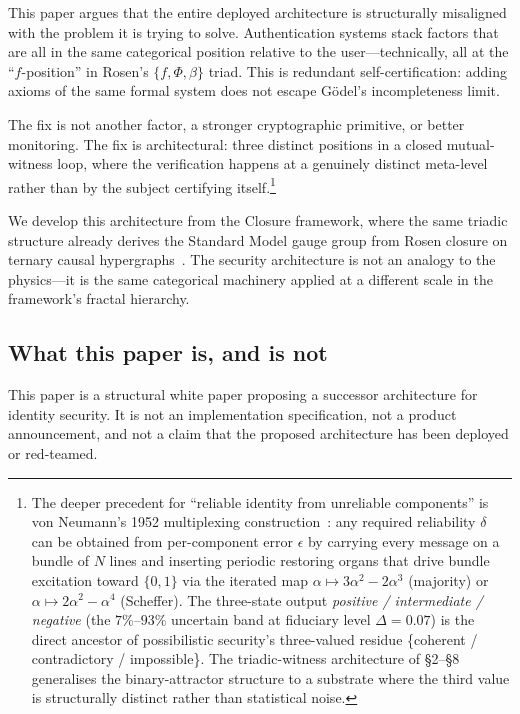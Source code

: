 \documentclass[11pt,a4paper]{article}
\theoremstyle{definition}
\theoremstyle{remark}
\begin{document}
This paper argues that the entire deployed architecture is structurally misaligned with the problem it is trying to solve. Authentication systems stack factors that are all in the same categorical position relative to the user---technically, all at the ``$f$-position'' in Rosen's $\{f, \Phi, \beta\}$ triad. This is redundant self-certification: adding axioms of the same formal system does not escape G\"odel's incompleteness limit.

The fix is not another factor, a stronger cryptographic primitive, or better monitoring. The fix is architectural: three distinct positions in a closed mutual-witness loop, where the verification happens at a genuinely distinct meta-level rather than by the subject certifying itself.\footnote{The deeper precedent for ``reliable identity from unreliable components'' is von Neumann's 1952 multiplexing construction~\cite{vonNeumann1952}: any required reliability $\delta$ can be obtained from per-component error $\epsilon$ by carrying every message on a bundle of $N$ lines and inserting periodic restoring organs that drive bundle excitation toward $\{0, 1\}$ via the iterated map $\alpha \mapsto 3\alpha^2 - 2\alpha^3$ (majority) or $\alpha \mapsto 2\alpha^2 - \alpha^4$ (Scheffer). The three-state output \emph{positive / intermediate / negative} (the $7\%$--$93\%$ uncertain band at fiduciary level $\Delta = 0.07$) is the direct ancestor of possibilistic security's three-valued residue \{coherent / contradictory / impossible\}. The triadic-witness architecture of \S2--\S8 generalises the binary-attractor structure to a substrate where the third value is structurally distinct rather than statistical noise.}

We develop this architecture from the Closure framework, where the same triadic structure already derives the Standard Model gauge group from Rosen closure on ternary causal hypergraphs~\cite{green2026}. The security architecture is not an analogy to the physics---it is the same categorical machinery applied at a different scale in the framework's fractal hierarchy.

\subsection{What this paper is, and is not}

This paper is a structural white paper proposing a successor architecture for identity security. It is not an implementation specification, not a product announcement, and not a claim that the proposed architecture has been deployed or red-teamed.
\end{document}
